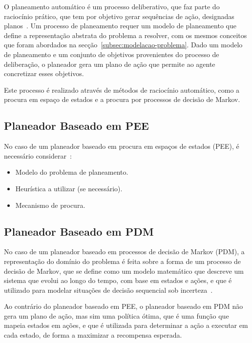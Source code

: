 O planeamento automático é um processo deliberativo, que faz parte do raciocínio prático,
que tem por objetivo
gerar sequências de ação, designadas planos~\cite{isel:iasa:slides:plan-autom-pee}.
Um processo de planeamento requer um modelo de planeamento que define a representação abstrata do problema a resolver, com os mesmos conceitos que foram abordados na secção~\ref{subsec:modelacao-problema}.
Dado um modelo de planeamento e um conjunto de objetivos provenientes do processo de deliberação, o planeador gera um plano de ação que permite ao agente concretizar esses objetivos.

Este processo é realizado através de métodos de raciocínio automático, como a procura em
espaço de estados e a procura por processos de decisão de Markov.

\subsection{Planeador Baseado em PEE}\label{subsec:planeador-baseado-em-pee}

No caso de um planeador baseado em procura em espaços de estados (PEE), é necessário considerar~\cite{isel:iasa:slides:plan-autom-pee}:

\begin{itemize}
    \item Modelo do problema de planeamento.
    \item Heurística a utilizar (se necessário).
    \item Mecanismo de procura.
\end{itemize}

\subsection{Planeador Baseado em PDM}\label{subsec:planeador-baseado-em-pdm}

No caso de um planeador baseado em processos de decisão de Markov (PDM), a representação do domínio do problema é feita sobre a forma de um processo de decisão de Markov, que se define como um modelo matemático que descreve um sistema que evolui ao longo do tempo, com base em estados e ações, e que é utilizado para modelar situações de decisão sequencial sob incerteza~\cite{isel:iasa:slides:plan-autom-pdm}.

Ao contrário do planeador baseado em PEE, o planeador baseado em PDM não gera um plano de ação, mas sim uma política ótima, que é uma função que mapeia estados em ações, e que é utilizada para determinar a ação a executar em cada estado, de forma a maximizar a recompensa esperada.


